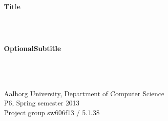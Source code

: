 \thispagestyle{empty}

\begin{center}
\vspace*{\fill}
	\hrulefill\newline
	\\
	\begin{LARGE}	
	\textbf{Title}
	\end{LARGE}
	\\
	\begin{large} 
	\textbf{\\OptionalSubtitle}%
	\end{large}\\
	\hrulefill\newline
	\\~\\
	Aalborg University, Department of Computer Science\\
	P6, Spring semester 2013\\
	Project group sw606f13 / 5.1.38\\

\vspace*{1.5cm}
\begin{figure}[H]
\end{figure}
\vspace*{\fill}
\end{center}